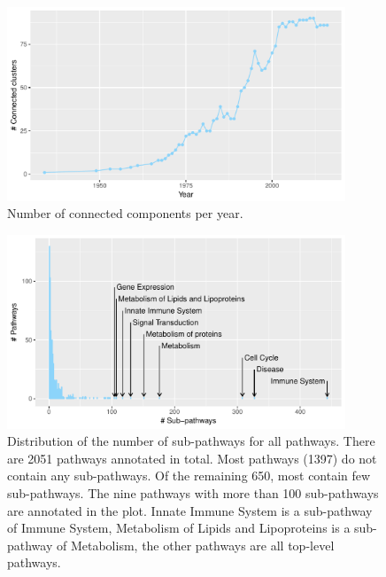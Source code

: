 \documentclass[10pt]{article}
\begin{document}
\begin{figure}
  \centering
  \includegraphics[width=0.9\textwidth]{../S1/FigureS1.pdf}
  \caption{Number of connected components per year.}
  \label{fig:s1}
\end{figure}

\begin{figure}
  \centering
  \includegraphics[width=0.9\textwidth]{../S2/FigureS2.pdf}
  \caption{Distribution of the number of sub-pathways for all
    pathways. There are 2051 pathways annotated in total. Most
    pathways (1397) do not contain any sub-pathways. Of the remaining
    650, most contain few sub-pathways. The nine pathways with more
    than 100 sub-pathways are annotated in the plot. Innate Immune
    System is a sub-pathway of Immune System, Metabolism of Lipids and
    Lipoproteins is a sub-pathway of Metabolism, the other pathways
    are all top-level pathways.}
  \label{fig:s2}
\end{figure}
\end{document}
